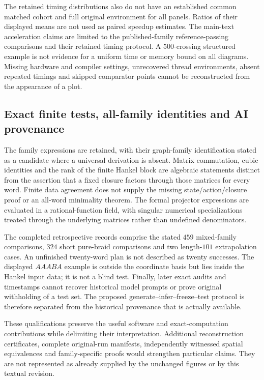The retained timing distributions also do not have an established common matched cohort and full original environment for all panels. Ratios of their displayed means are not used as paired speedup estimates. The main-text acceleration claims are limited to the published-family reference-passing comparisons and their retained timing protocol. A $500$-crossing structured example is not evidence for a uniform time or memory bound on all diagrams. Missing hardware and compiler settings, unrecovered thread environments, absent repeated timings and skipped comparator points cannot be reconstructed from the appearance of a plot.

\subsection{Exact finite tests, all-family identities and AI provenance}
\label{supp:limitations_discovery}
The family expressions are retained, with their graph-family identification stated as a candidate where a universal derivation is absent. Matrix commutation, cubic identities and the rank of the finite Hankel block are algebraic statements distinct from the assertion that a fixed closure factors through those matrices for every word. Finite data agreement does not supply the missing state/action/closure proof or an all-word minimality theorem. The formal projector expressions are evaluated in a rational-function field, with singular numerical specializations treated through the underlying matrices rather than undefined denominators.

The completed retrospective records comprise the stated $459$ mixed-family comparisons, $324$ short pure-braid comparisons and two length-$101$ extrapolation cases. An unfinished twenty-word plan is not described as twenty successes. The displayed $AAABA$ example is outside the coordinate basis but lies inside the Hankel input data; it is not a blind test. Finally, later exact audits and timestamps cannot recover historical model prompts or prove original withholding of a test set. The proposed generate--infer--freeze--test protocol is therefore separated from the historical provenance that is actually available.

These qualifications preserve the useful software and exact-computation contributions while delimiting their interpretation. Additional reconstruction certificates, complete original-run manifests, independently witnessed spatial equivalences and family-specific proofs would strengthen particular claims. They are not represented as already supplied by the unchanged figures or by this textual revision.


